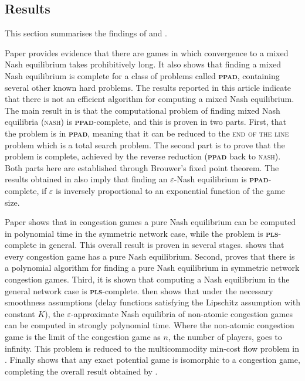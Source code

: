\documentclass{article}
\begin{document}
\begin{multicols}{2}
\section{Results}
This section summarises the findings of \cite{Daskalakis.2009} and \cite{Fabrikant.2004}.

Paper \cite{Daskalakis.2009} provides evidence that there are games in which convergence to a mixed Nash equilibrium takes prohibitively long. It also shows that finding a mixed Nash equilibrium is complete for a class of problems called \textbf{\textsc{ppad}}, containing several other known hard problems. The results reported in this article indicate that there is not an efficient algorithm for computing a mixed Nash equilibrium. The main result in \cite{Daskalakis.2009} is that the computational problem of finding mixed Nash equilibria (\textsc{nash}) is \textbf{\textsc{ppad}}-complete, and this is proven in two parts. First, that the problem is in \textbf{\textsc{ppad}}, meaning that it can be reduced to the \textsc{end of the line} problem which is a total search problem. The second part is to prove that the problem is complete, achieved by the reverse reduction (\textbf{\textsc{ppad}} back to \textsc{nash}). Both parts here are established through Brouwer's fixed point theorem. The results obtained in \cite{Daskalakis.2009} also imply that finding an $\varepsilon$-Nash equilibrium is \textbf{\textsc{ppad}}-complete, if $\varepsilon$ is inversely proportional to an exponential function of the game size. 

Paper \cite{Fabrikant.2004} shows that in congestion games a pure Nash equilibrium can be computed in polynomial time in the symmetric network case, while the problem is \textbf{\textsc{pls}}-complete in general. This overall result is proven in several stages. \cite{rosenthal1973class} shows that every congestion game has a pure Nash equilibrium. Second, \cite{Fabrikant.2004} proves that there is a polynomial algorithm for finding a pure Nash equilibrium in symmetric network congestion games. Third, it is shown that computing a Nash equilibrium in the general network case is \textbf{\textsc{pls}}-complete. \cite{Fabrikant.2004} then shows that under the necessary smoothness assumptions (delay functions satisfying the Lipschitz assumption with constant $K$), the $\varepsilon$-approximate Nash equilibria of non-atomic congestion games can be computed in strongly polynomial time. Where the non-atomic congestion game is the limit of the congestion game as $n$, the number of players, goes to infinity. This problem is reduced to the multicommodity min-cost flow problem in \cite{Fabrikant.2004}. Finally \cite{monderer1996potential} shows that any exact potential game is isomorphic to a congestion game, completing the overall result obtained by \cite{Fabrikant.2004}. 



\end{multicols}
\end{document}
